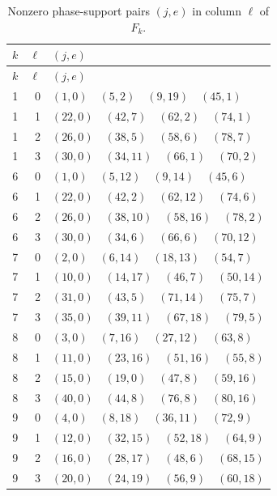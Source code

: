 \begin{longtable}{@{}rrl@{}}
\caption{Nonzero phase-support pairs $(j,e)$ in column $\ell$ of $F_k$.}\label{tab:phases}\\
\toprule $k$ & $\ell$ & $(j,e)$ \\ \midrule\endfirsthead
\toprule $k$ & $\ell$ & $(j,e)$ \\ \midrule\endhead
1 & 0 & $(1,0)\quad (5,2)\quad (9,19)\quad (45,1)$ \\
1 & 1 & $(22,0)\quad (42,7)\quad (62,2)\quad (74,1)$ \\
1 & 2 & $(26,0)\quad (38,5)\quad (58,6)\quad (78,7)$ \\
1 & 3 & $(30,0)\quad (34,11)\quad (66,1)\quad (70,2)$ \\
6 & 0 & $(1,0)\quad (5,12)\quad (9,14)\quad (45,6)$ \\
6 & 1 & $(22,0)\quad (42,2)\quad (62,12)\quad (74,6)$ \\
6 & 2 & $(26,0)\quad (38,10)\quad (58,16)\quad (78,2)$ \\
6 & 3 & $(30,0)\quad (34,6)\quad (66,6)\quad (70,12)$ \\
7 & 0 & $(2,0)\quad (6,14)\quad (18,13)\quad (54,7)$ \\
7 & 1 & $(10,0)\quad (14,17)\quad (46,7)\quad (50,14)$ \\
7 & 2 & $(31,0)\quad (43,5)\quad (71,14)\quad (75,7)$ \\
7 & 3 & $(35,0)\quad (39,11)\quad (67,18)\quad (79,5)$ \\
8 & 0 & $(3,0)\quad (7,16)\quad (27,12)\quad (63,8)$ \\
8 & 1 & $(11,0)\quad (23,16)\quad (51,16)\quad (55,8)$ \\
8 & 2 & $(15,0)\quad (19,0)\quad (47,8)\quad (59,16)$ \\
8 & 3 & $(40,0)\quad (44,8)\quad (76,8)\quad (80,16)$ \\
9 & 0 & $(4,0)\quad (8,18)\quad (36,11)\quad (72,9)$ \\
9 & 1 & $(12,0)\quad (32,15)\quad (52,18)\quad (64,9)$ \\
9 & 2 & $(16,0)\quad (28,17)\quad (48,6)\quad (68,15)$ \\
9 & 3 & $(20,0)\quad (24,19)\quad (56,9)\quad (60,18)$ \\
\bottomrule
\end{longtable}
